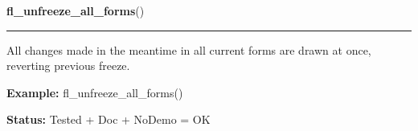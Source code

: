     \vspace{0.5ex}

\hspace{.8\funcindent}\begin{boxedminipage}{\funcwidth}

    \raggedright \textbf{fl\_unfreeze\_all\_forms}()

    \vspace{-1.5ex}

    \rule{\textwidth}{0.5\fboxrule}
\setlength{\parskip}{2ex}
    All changes made in the meantime in all current forms are drawn at 
    once, reverting previous freeze.

\setlength{\parskip}{1ex}
\textbf{Example:} fl\_unfreeze\_all\_forms()



\textbf{Status:} Tested + Doc + NoDemo = OK



    \end{boxedminipage}

    \label{xformslib:flbasic:fl_scale_form}

    \vspace{0.5ex}


